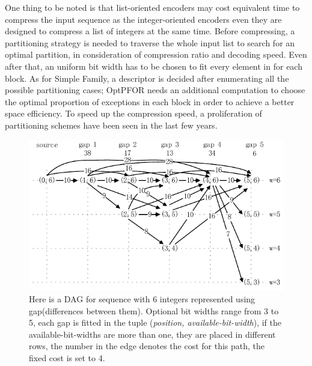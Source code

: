 \documentclass[runningheads,a4paper]{llncs}
\begin{document}
One thing to be noted is that list-oriented encoders may cost equivalent time to compress the input sequence as the integer-oriented encoders even they are designed to compress a list of integers at the same time. Before compressing, a partitioning strategy is needed to traverse the whole input list to search for an optimal partition, in consideration of compression ratio and decoding speed. Even after that, an uniform bit width has to be chosen to fit every element in for each block. As for Simple Family, a descriptor is decided after enumerating all the possible partitioning cases; OptPFOR needs an additional computation to choose the optimal proportion of exceptions in each block in order to achieve a better space efficiency. To speed up the compression speed, a proliferation of partitioning schemes have been seen in the last few years\cite{anh2004index,delbru2010adaptive,silvestri2010vsencoding,ottaviano2014partitioned}.

\begin{figure}
	\centering
	\includegraphics[width=0.7\linewidth]{sssp}
	\caption[sssp]{Here is a DAG for sequence with 6 integers represented using gap(differences between them). Optional bit widths range from 3 to 5, each gap is fitted in the tuple (\textit{position, available-bit-width}), if the available-bit-widths are more than one, they are placed in different rows, the number in the edge denotes the cost for this path, the fixed cost is set to 4.}
	\label{fig:sssp}
\end{figure}
\end{document}
